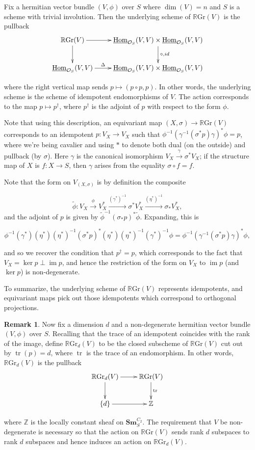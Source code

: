 \documentclass[draftthesis,tocnosub,noragright,centerchapter,10pt]{uiucthesis2009}
\newcommand{\Z}{\mathbb Z}
\newcommand{\mc}{\mathcal}
\newcommand{\RGr}{\mathbb R\mathrm{Gr}}
\newcommand{\Sm}[1]{\mathbf{Sm}_{#1}}
\DeclareMathOperator*{\im}{im}
\DeclareMathOperator{\Hom}{Hom}
\DeclareMathOperator{\tr}{tr}
\theoremstyle{plain}
\theoremstyle{definition}
\newtheorem{remark}[lemma]{Remark}
\begin{document}
Fix a hermitian vector bundle $(V,\phi)$ over $S$ where $\dim(V) = n$
and $S$ is a scheme with
trivial involution. Then the underlying scheme of $\RGr(V)$ is the
pullback 
\[
\xymatrix{\RGr(V) \ar[r]\ar[d] & \uline{\Hom}_{\mc O_S}(V,V) \times
  \uline{\Hom}_{\mc O_S}(V,V) \ar[d]^{\circ, id} \\ \uline{\Hom}_{\mc
    O_S}(V,V) \ar[r]^-\Delta & \uline{\Hom}_{\mc O_S}(V,V) \times \uline{\Hom}_{\mc O_S}(V,V)}
\]

where the right vertical map sends $p \mapsto (p \circ p, p)$. In
other words, the underlying scheme is the scheme of idempotent
endomorphisms of $V$. The action corresponds to the map $p \mapsto
p^\dagger$, where $p^\dagger$ is the adjoint of $p$ with respect to
the form $\phi$. 

Note that using this description, an equivariant map $(X,\sigma) \rightarrow
\RGr(V)$ corresponds to an idempotent $p : V_X \rightarrow V_X$ such
that $\phi^{-1}(\gamma^{-1}(\sigma^*p)\gamma)^*\phi = p$, where we're being cavalier
and using $\ast$ to denote both dual (on the outside) and pullback (by
$\sigma$). Here $\gamma$ is the canonical isomorphism $V_X
\xrightarrow{\gamma} \sigma^*V_X$; if the structure map of $X$ is $f :
X \rightarrow S$, then $\gamma$ arises from the equality $\sigma \circ f = f$.

Note that the form on $V_{(X,\sigma)}$ is by definition the composite

\[
\widetilde \phi : V_X \xrightarrow{\phi} V_X^* \xrightarrow{(\gamma^*)^{-1}} \sigma^*V_X^*
\xrightarrow{(\eta^*)^{-1}} \sigma_*V_X^*,
\]
and the adjoint of $p$ is given by $\widetilde \phi^{-1} (\sigma_*p)^*
\widetilde \phi$. Expanding, this is

\[
\phi^{-1}(\gamma^*)(\eta^*)(\eta^*)^{-1}(\sigma^*p)^*(\eta^*)(\eta^*)^{-1}(\gamma^*)^{-1}\phi
= \phi^{-1}(\gamma^{-1}(\sigma^*p)\gamma)^*\phi,
\]

and so we recover the condition that $p^\dagger  =  p$, which
corresponds to the fact that $V_X = \ker p \perp \im p$, and hence the
restriction of the form on $V_X$ to $\im p$ (and $\ker p$) is
non-degenerate. 

To summarize, the underlying scheme of $\RGr(V)$ represents
idempotents, and equivariant maps pick out those idempotents which
correspond to orthogonal projections. 

\begin{remark}

Now fix a dimension $d$ and a non-degenerate hermitian vector bundle
$(V,\phi)$ over $S$.  Recalling that the trace of an idempotent
coincides with the rank of the image, define $\RGr_d(V)$ to be the closed
subscheme of $\RGr(V)$ cut out by $\tr(p) = d$, where $\tr$ is the
trace of an endomorphism. In other words, $\RGr_d(V)$ is the pullback
\[
\xymatrix{\RGr_d(V) \ar[r]\ar[d] & \RGr(V) \ar[d]^{\tr} \\ \{d\}
  \ar[r] & \Z}
\]

where $\Z$ is the locally constant sheaf on $\Sm{S}^{C_2}$. The
requirement that $V$ be non-degenerate is necessary so that the action
on $\RGr(V)$ sends rank $d$ subspaces to rank $d$ subspaces and hence
induces an action on $\RGr_d(V)$.
\end{remark}
\end{document}
